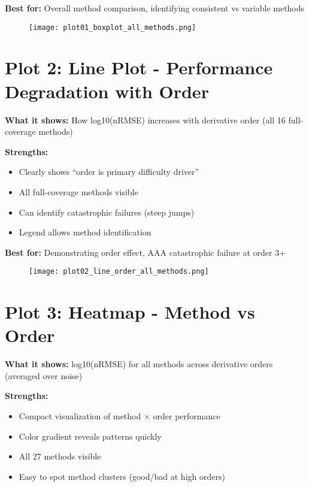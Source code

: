 \documentclass[11pt]{article}
\begin{document}
\textbf{Best for:} Overall method comparison, identifying consistent vs variable methods

\begin{figure}[h]
\centering
\texttt{[image: plot01\_boxplot\_all\_methods.png]}
\end{figure}

\clearpage


\section*{Plot 2: Line Plot - Performance Degradation with Order}

\textbf{What it shows:} How log10(nRMSE) increases with derivative order (all 16 full-coverage methods)

\textbf{Strengths:}
\begin{itemize}
    \item Clearly shows ``order is primary difficulty driver''
    \item All full-coverage methods visible
    \item Can identify catastrophic failures (steep jumps)
    \item Legend allows method identification
\end{itemize}

\textbf{Best for:} Demonstrating order effect, AAA catastrophic failure at order 3+

\begin{figure}[h]
\centering
\texttt{[image: plot02\_line\_order\_all\_methods.png]}
\end{figure}

\clearpage


\section*{Plot 3: Heatmap - Method vs Order}

\textbf{What it shows:} log10(nRMSE) for all methods across derivative orders (averaged over noise)

\textbf{Strengths:}
\begin{itemize}
    \item Compact visualization of method × order performance
    \item Color gradient reveals patterns quickly
    \item All 27 methods visible
    \item Easy to spot method clusters (good/bad at high orders)
\end{itemize}
\end{document}
